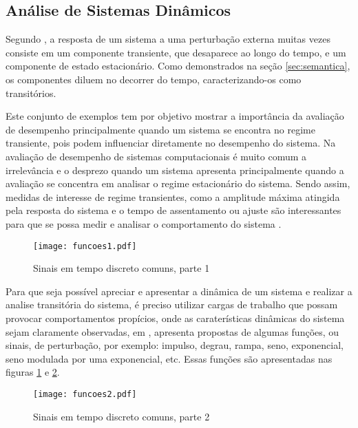 \subsection{Análise de Sistemas Dinâmicos}
Segundo \cite{Janert2013}, a resposta de um sistema a uma perturbação externa muitas vezes consiste em um componente transiente, que desaparece ao longo do tempo, e um componente de estado estacionário. Como demonstrados na seção \ref{sec:semantica}, os componentes diluem no decorrer do tempo, caracterizando-os como transitórios. 

Este conjunto de exemplos tem por objetivo mostrar a importância da avaliação de desempenho principalmente quando um sistema se encontra no regime transiente, pois podem influenciar diretamente no desempenho do sistema. Na avaliação de desempenho de sistemas computacionais é muito comum a irrelevância e o desprezo quando um sistema apresenta  principalmente quando a avaliação se concentra em analisar o regime estacionário do sistema. Sendo assim, medidas de interesse de regime transientes, como a amplitude máxima atingida pela resposta do sistema e o tempo de assentamento ou ajuste são interessantes para que se possa medir e analisar o comportamento do sistema \cite{Nobile2013}.

\begin{figure}[!htb]
	\caption{Sinais em tempo discreto comuns, parte 1}
	\label{fig:funcoes1}
	\centering
	\texttt{[image: funcoes1.pdf]}
\end{figure}

Para que seja possível apreciar e apresentar a dinâmica de um sistema e realizar a analise transitória do sistema, é preciso utilizar cargas de trabalho que possam provocar comportamentos propícios, onde as caraterísticas dinâmicas do sistema sejam claramente observadas, em \cite{Hellerstein2004}, apresenta propostas de algumas funções, ou sinais, de perturbação, por exemplo: impulso, degrau, rampa, seno, exponencial, seno modulada por uma exponencial, etc.  Essas funções são apresentadas nas figuras \ref{fig:funcoes1} e \ref{fig:funcoes2}.


\begin{figure}[!htb]
	\caption{Sinais em tempo discreto comuns, parte 2}
	\label{fig:funcoes2}
	\centering
	\texttt{[image: funcoes2.pdf]}
\end{figure}

